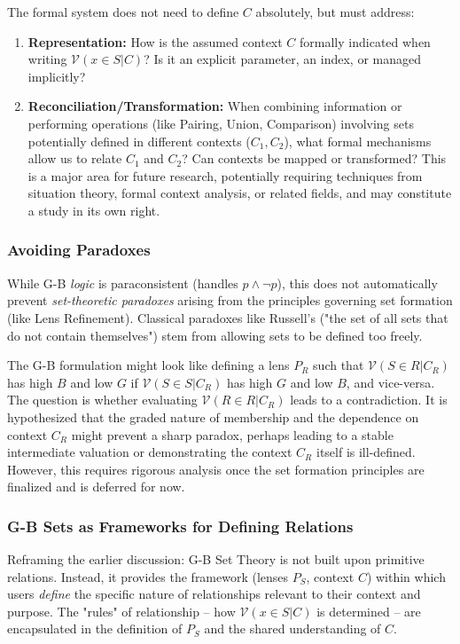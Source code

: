 \documentclass[11pt]{article}
\newcommand{\gbval}[1]{\mathcal{V}(#1)}         %
\newcommand{\pset}[1]{P_{#1}}                   %
\theoremstyle{definition}
\theoremstyle{plain}
\begin{document}
The formal system does not need to define $C$ absolutely, but must address:
\begin{enumerate}
    \item \textbf{Representation:} How is the assumed context $C$ formally indicated when writing $\gbval{x \in S | C}$? Is it an explicit parameter, an index, or managed implicitly?
    \item \textbf{Reconciliation/Transformation:} When combining information or performing operations (like Pairing, Union, Comparison) involving sets potentially defined in different contexts ($C_1, C_2$), what formal mechanisms allow us to relate $C_1$ and $C_2$? Can contexts be mapped or transformed? This is a major area for future research, potentially requiring techniques from situation theory, formal context analysis, or related fields, and may constitute a study in its own right.
\end{enumerate}

\subsubsection{Avoiding Paradoxes} \label{sec:paradoxes}
While G-B \textit{logic} is paraconsistent (handles $p \land \neg p$), this does not automatically prevent \textit{set-theoretic paradoxes} arising from the principles governing set formation (like Lens Refinement). Classical paradoxes like Russell's ("the set of all sets that do not contain themselves") stem from allowing sets to be defined too freely.

The G-B formulation might look like defining a lens $\pset{R}$ such that $\gbval{S \in R | C_R}$ has high $B$ and low $G$ if $\gbval{S \in S | C_R}$ has high $G$ and low $B$, and vice-versa. The question is whether evaluating $\gbval{R \in R | C_R}$ leads to a contradiction. It is hypothesized that the graded nature of membership and the dependence on context $C_R$ might prevent a sharp paradox, perhaps leading to a stable intermediate valuation or demonstrating the context $C_R$ itself is ill-defined. However, this requires rigorous analysis once the set formation principles are finalized and is deferred for now.

\subsubsection{G-B Sets as Frameworks for Defining Relations} \label{sec:gb_relations}
Reframing the earlier discussion: G-B Set Theory is not built upon primitive relations. Instead, it provides the framework (lenses $\pset{S}$, context $C$) within which users \textit{define} the specific nature of relationships relevant to their context and purpose. The "rules" of relationship – how $\gbval{x \in S | C}$ is determined – are encapsulated in the definition of $\pset{S}$ and the shared understanding of $C$.
\end{document}
